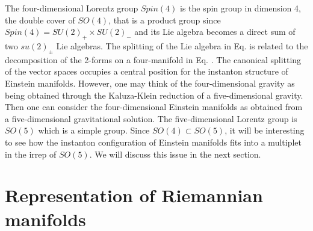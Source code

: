 \documentclass[12pt,epsf]{article}
\begin{document}
The four-dimensional Lorentz group $Spin(4)$ is the spin group in dimension 4, the double cover of $SO(4)$,
that is a product group since $Spin(4) = SU(2)_+ \times SU(2)_-$
and its Lie algebra becomes a direct sum of two $su(2)_\pm$ Lie algebras.
The splitting of the Lie algebra in Eq.  is related to the decomposition
of the 2-forms on a four-manifold in Eq. .
The canonical splitting of the vector spaces occupies a central position for the instanton structure of Einstein manifolds.
However, one may think of the four-dimensional gravity as being obtained through the Kaluza-Klein reduction
of a five-dimensional gravity. Then one can consider the four-dimensional Einstein manifolds as obtained
from a five-dimensional gravitational solution.
The five-dimensional Lorentz group is $SO(5)$ which is a simple group.
Since $SO(4) \subset SO(5)$, it will be interesting to see how the instanton configuration of Einstein manifolds
fits into a multiplet in the irrep of $SO(5)$.
We will discuss this issue in the next section.






\section{Representation of Riemannian manifolds}
\end{document}
